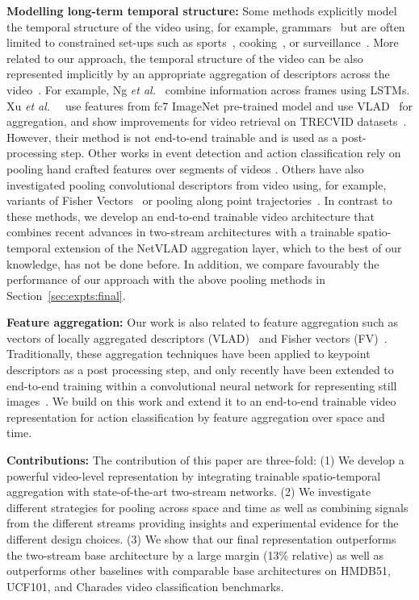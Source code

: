 \documentclass[10pt,twocolumn,letterpaper]{article}
\newcommand{\etalWspace}[0]{{\it et al.\ }}
\begin{document}
{\bf Modelling long-term temporal structure:}
Some methods explicitly model the temporal structure of the video using, for example, grammars~\cite{Pirsiavash14,Ryoo06} but are often limited to constrained set-ups such as sports~\cite{Msibrahi16}, cooking~\cite{Rohrbach12}, or surveillance~\cite{Amer13}.
More related to our approach, the temporal structure of the video can be also represented implicitly by an appropriate aggregation of descriptors across the video~\cite{Fernando_15,Lev16,Ng_15,Peng14,WangL_15a,Xu_15}. For example, Ng \etalWspace\cite{Ng_15} combine information across frames
using LSTMs.
Xu \etalWspace~\cite{Xu_15} use features from fc7 ImageNet pre-trained
model and use VLAD~\cite{Jegou_10_VLAD} for aggregation, and show
improvements for video retrieval on TRECVID datasets~\cite{2016trecvidawad}.
However, their method is not end-to-end trainable and is used as a post-processing step.
Other works in event detection and action classification rely
on pooling hand crafted features over segments of videos
\cite{Gaidon13,Li13,Niebles2010,Raptis13,Tang12}.
Others have also investigated pooling convolutional descriptors from video
using, for example, variants of Fisher Vectors~\cite{Lev16,Peng14} or pooling
along point trajectories~\cite{WangL_15a}.
In contrast to these methods, we develop an end-to-end trainable video architecture that combines recent advances in two-stream architectures with a trainable spatio-temporal extension of the NetVLAD aggregation layer, which to the best of our knowledge, has not be done before. In addition, we compare favourably the performance of our approach with the above pooling methods in Section~\ref{sec:expts:final}.

{\bf Feature aggregation:}
Our work is also related to feature aggregation such as vectors of locally aggregated descriptors (VLAD)~\cite{Jegou_10_VLAD} and Fisher vectors (FV)~\cite{Perronnin_07,sydorov14cvpr}.
Traditionally, these aggregation techniques have been applied to keypoint descriptors as a post processing
step, and only recently have been extended to  end-to-end training within a convolutional neural network for representing still images~\cite{Arandjelovic16}.
We build on this work and extend it to an end-to-end trainable video representation for action classification by
feature aggregation over space and time.

{\bf Contributions:}
The contribution of this paper are three-fold:
(1) We develop a powerful video-level representation by integrating trainable spatio-temporal aggregation with state-of-the-art two-stream networks. 
(2) We investigate different strategies for pooling across space and time as well as combining signals from the different streams providing insights and experimental evidence for the different design choices. 
(3) We  show  that  our final representation  outperforms  the  two-stream  base  architecture by a large margin (13\% relative) as well as outperforms other baselines with comparable base architectures on
HMDB51, UCF101, and Charades video classification benchmarks.
\end{document}
